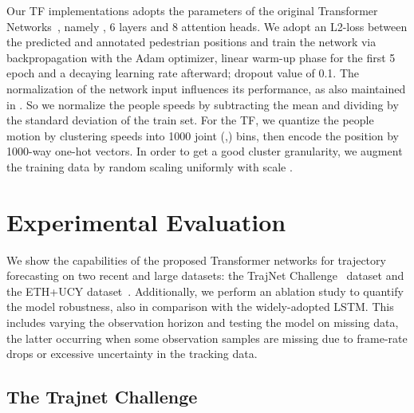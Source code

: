 \documentclass[a4paper,conference]{IEEEtran}
\begin{document}
Our TF implementations adopts the parameters of the original Transformer Networks~\cite{TransformersNIPS17}, namely , 6 layers and 8 attention heads. We adopt an L2-loss between the predicted and annotated pedestrian positions and train the network via backpropagation with the Adam optimizer, linear warm-up phase for the first 5 epoch and a decaying learning rate afterward; dropout value of 0.1.
The normalization of the network input influences its performance, as also maintained in \cite{zhang2019sr,graves2013generating}. So we normalize the people speeds by subtracting the mean and dividing by the standard deviation of the train set.
For the TF, we quantize the people motion by clustering speeds into 1000 joint (,) bins, then encode the position by 1000-way one-hot vectors. In order to get a good cluster granularity, we augment the training data by random scaling uniformly with scale .












 \section{Experimental Evaluation}\label{Sec:exp}


We show the capabilities of the proposed Transformer networks for trajectory forecasting on two recent and large datasets: the TrajNet Challenge~\cite{sadeghiankosaraju2018trajnet} dataset and the ETH+UCY dataset~\cite{pellegrini2009iccv,lerner2007crowds}. Additionally, we perform an ablation study to quantify the model robustness, also in comparison with the widely-adopted LSTM. This includes varying the observation horizon and testing the model on missing data, the latter occurring when some observation samples are missing due to frame-rate drops or excessive uncertainty in the tracking data.




\subsection{The Trajnet Challenge}\label{sec:trajnet}
\end{document}
